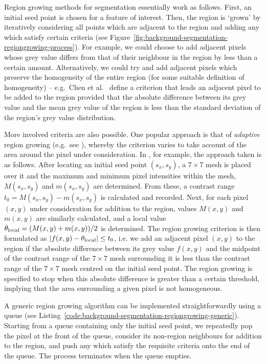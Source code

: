 Region growing methods for segmentation essentially work as follows. First, an initial seed point is chosen for a feature of interest. Then, the region is `grown' by iteratively considering all points which are adjacent to the region and adding any which satisfy certain criteria (see Figure~\ref{fig:background-segmentation-regiongrowing-process}). For example, we could choose to add adjacent pixels whose grey value differs from that of their neighbour in the region by less than a certain amount. Alternatively, we could try and add adjacent pixels which preserve the homogeneity of the entire region (for some suitable definition of homogeneity) -- e.g.~Chen et al.\ \cite{chen09} define a criterion that leads an adjacent pixel to be added to the region provided that the absolute difference between its grey value and the mean grey value of the region is less than the standard deviation of the region's grey value distribution.


More involved criteria are also possible. One popular approach is that of \emph{adaptive} region growing (e.g.~see \cite{lin06,pohle01}), whereby the criterion varies to take account of the area around the pixel under consideration. In \cite{lin06}, for example, the approach taken is as follows. After locating an initial seed point $(s_x, s_y)$, a $7 \times 7$ mesh is placed over it and the maximum and minimum pixel intensities within the mesh, $M(s_x, s_y)$ and $m(s_x, s_y)$ are determined. From these, a contrast range $t_0 = M(s_x, s_y) - m(s_x, s_y)$ is calculated and recorded. Next, for each pixel $(x,y)$ under consideration for addition to the region, values $M(x,y)$ and $m(x,y)$ are similarly calculated, and a local value $\theta_{\rm local} = (M(x,y) + m(x,y)) / 2$ is determined. The region growing criterion is then formulated as $|f(x,y) - \theta_{\rm local}| \le t_0$, i.e. we add an adjacent pixel $(x,y)$ to the region if the absolute difference between its grey value $f(x,y)$ and the midpoint of the contrast range of the $7 \times 7$ mesh surrounding it is less than the contrast range of the $7 \times 7$ mesh centred on the initial seed point. The region growing is specified to stop when this absolute difference is greater than a certain threshold, implying that the area surrounding a given pixel is not homogeneous.

A generic region growing algorithm can be implemented straightforwardly using a queue (see Listing~\ref{code:background-segmentation-regiongrowing-generic}). Starting from a queue containing only the initial seed point, we repeatedly pop the pixel at the front of the queue, consider its non-region neighbours for addition to the region, and push any which satisfy the requisite criteria onto the end of the queue. The process terminates when the queue empties.

